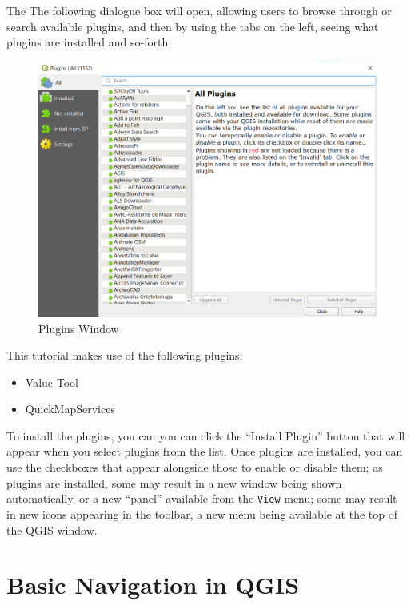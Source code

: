 \documentclass[
  letterpaper,
  DIV=11,
  numbers=noendperiod]{scrreprt}
\providecommand{\tightlist}{%
  \setlength{\itemsep}{0pt}\setlength{\parskip}{0pt}}\usepackage{longtable,booktabs,array}
\begin{document}
The The following dialogue box will open, allowing users to browse
through or search available plugins, and then by using the tabs on the
left, seeing what plugins are installed and so-forth.

\begin{figure}

{\centering \includegraphics{./images/PluginsWindow.png}

}

\caption{Plugins Window}

\end{figure}

This tutorial makes use of the following plugins:

\begin{itemize}
\tightlist
\item
  Value Tool
\item
  QuickMapServices
\end{itemize}

To install the plugins, you can you can click the ``Install Plugin''
button that will appear when you select plugins from the list. Once
plugins are installed, you can use the checkboxes that appear alongside
those to enable or disable them; as plugins are installed, some may
result in a new window being shown automatically, or a new ``panel''
available from the \texttt{View} menu; some may result in new icons
appearing in the toolbar, a new menu being available at the top of the
QGIS window.

\hypertarget{basic-navigation-in-qgis}{%
\section{Basic Navigation in QGIS}\label{basic-navigation-in-qgis}}
\end{document}
